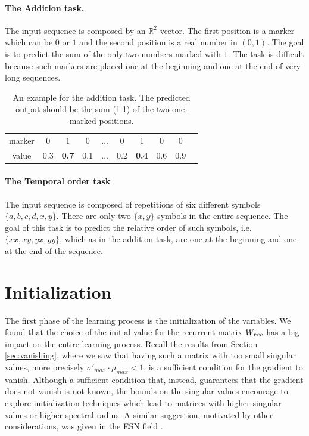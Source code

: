 \paragraph{The Addition task.}
The input sequence is composed by an $\mathbb{R}^2$ vector. The first position is a marker which can be $0$ or $1$ and the second position is a real number in $(0,1)$. The goal is to predict the sum of the only two numbers marked with $1$. The task is difficult because such markers are placed one at the beginning and one at the end of very long sequences.

\begin{table}[h]
	\centering
\begin{tabular}{|c|c|c|c|c|c|c|c|c|c}
	\hline  marker & 0&  1&  0&  $\hdots$& 0 & 1 & 0 & 0  \\ 
	value & 0.3&  \textbf{0.7}&  0.1&  $\hdots$& 0.2& \textbf{0.4} & 0.6& 0.9  \\ 
	\hline 
\end{tabular}
\caption{An example for the addition task. The predicted output should be the sum (1.1) of the two one-marked positions.}
\label{table:add_example}
\end{table}


\paragraph{The Temporal order task}
The input sequence is composed of repetitions of six different symbols $\{a, b, c, d , x, y\}$.
There are only two $\{x, y\}$ symbols in the entire sequence. The goal of this task is to predict the relative order of such symbols, i.e. $\{xx, xy, yx, yy\}$, which as in the addition task, are one at the beginning and one at the end of the sequence.


\section{Initialization}
The first phase of the learning process is the initialization of the variables. We found that the choice of the initial value for the recurrent matrix $W_{rec}$ has a big impact on the entire learning process. Recall the results from Section  \ref{sec:vanishing}, where we saw that having such a matrix with too small singular values, more precisely $\sigma'_{max} \cdot \mu_{max} <1 $, is a sufficient condition for the gradient to vanish. Although a sufficient condition that, instead, guarantees that the gradient does not vanish is not known, the bounds on the singular values encourage to explore initialization techniques which lead to matrices with higher singular values or higher spectral radius. A similar suggestion, motivated by other considerations, was given in the ESN field \cite{reservoirSummary}.

